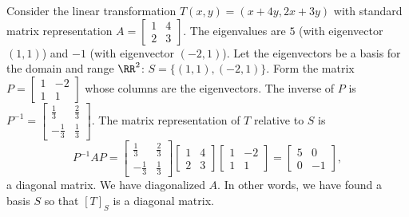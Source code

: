 \begin{example}
Consider the linear transformation $T(x,y) = (x+4y,2x+3y)$ with standard matrix representation $A=  
\begin{bmatrix}
 1 & 4 \\
 2 & 3
\end{bmatrix} 
$. The eigenvalues are $5$ (with eigenvector $(1,1)$) and $-1$ (with eigenvector $(-2,1)$).  Let the eigenvectors be a basis for the domain and range $\RR^2$: $S=\{(1,1),(-2,1)\}$.  Form the matrix 
$P=
\begin{bmatrix}
 1 & -2 \\
 1 & 1
\end{bmatrix} 
$ whose columns are the eigenvectors. The inverse of $P$ is 
$P^{-1} = 
\begin{bmatrix}
 \frac{1}{3} & \frac{2}{3} \\
 -\frac{1}{3} & \frac{1}{3}
\end{bmatrix} 
$. The matrix representation of $T$ relative to $S$ is 
$$
P^{-1}AP=\begin{bmatrix}
 \frac{1}{3} & \frac{2}{3} \\
 -\frac{1}{3} & \frac{1}{3}
\end{bmatrix} 
 \begin{bmatrix}
 1 & 4 \\
 2 & 3
\end{bmatrix} 
\begin{bmatrix}
 1 & -2 \\
 1 & 1
\end{bmatrix} 
=
\begin{bmatrix}
 5 & 0 \\
 0 & -1
\end{bmatrix} 
,$$ a diagonal matrix.  We have diagonalized $A$.  In other words, we have found a basis $S$ so that $[T]_S$ is a diagonal matrix.
\end{example}

